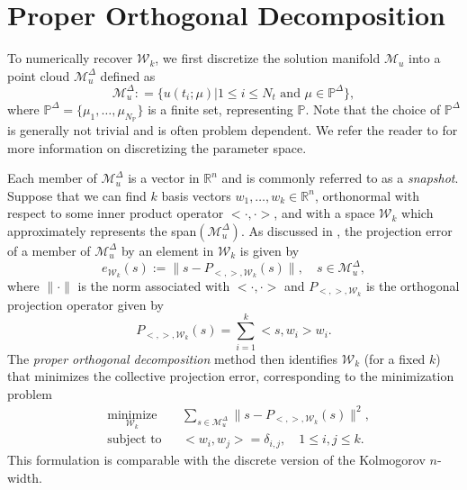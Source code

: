 \section{Proper Orthogonal Decomposition} \label{sec:3.2}
To numerically recover $\mathcal W_k$, we first discretize the solution manifold $\mathcal M_{u}$ into a point cloud $\mathcal M_{u}^{\Delta}$ defined as
\begin{equation} \label{eq:3.7}
	\mathcal M_{u}^{\Delta} : = \{ u(t_i;\mu) |  1\leq i \leq N_t \text{ and } \mu \in \mathbb P^{\Delta} \},
\end{equation}
where $\mathbb P^{\Delta} = \{ \mu_{1} , \dots , \mu_{N_{\mathbb P}} \}$ is a finite set, representing $\mathbb P$. Note that the choice of $\mathbb P^{\Delta}$ is generally not trivial and is often problem dependent. We refer the reader to \cite{quarteroni2015reduced} for more information on discretizing the parameter space.

Each member of $\mathcal M_{u}^{\Delta}$ is a vector in $\mathbb R^{n}$ and is commonly referred to as a \emph{snapshot}. Suppose that we can find $k$ basis vectors $w_1,\dots,w_k\in \mathbb R^{n}$, orthonormal with respect to some inner product operator $<\cdot,\cdot>$, and with a space $\mathcal W_k$ which approximately represents the span$(\mathcal M_u^\Delta)$. As discussed in , the projection error of a member of $\mathcal M_{u}^{\Delta}$ by an element in $\mathcal W_k$ is given by
\begin{equation} \label{eq:3.8}
	e_{\mathcal W_k}(s) := \| s - P_{<,>,\mathcal W_k}(s) \|, \quad s\in \mathcal M_u^{\Delta},
\end{equation}
where $\| \cdot \|$ is the norm associated with $<\cdot,\cdot>$ and $P_{<,>,\mathcal W_k}$ is the orthogonal projection operator given by
\begin{equation} \label{eq:3.9}
	P_{<,>,\mathcal W_k}(s) = \sum_{i=1}^k <s,w_i> w_i.
\end{equation}
The \emph{proper orthogonal decomposition} method then identifies $\mathcal W_k$ (for a fixed $k$) that minimizes the collective projection error, corresponding to the minimization problem
\begin{equation} \label{eq:3.10}
\begin{aligned}
&  \underset{\mathcal W_k}{\text{minimize}}
& & \sum_{s\in \mathcal M_u^{\Delta}} \| s - P_{<,>,\mathcal W_k} (s)\|^2, \\
& \text{subject to}
& & <w_i,w_j> = \delta_{i,j}, \quad 1\leq i,j \leq k.
\end{aligned}
\end{equation}
This formulation is comparable with the discrete version of the Kolmogorov $n$-width. 
